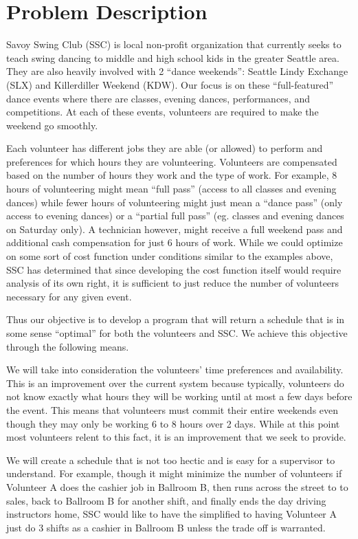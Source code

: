 \documentclass[12pt]{article}
\theoremstyle{definition}
\begin{document}
\section{Problem Description}
\begin{multicols}{2}
Savoy Swing Club (SSC) is local non-profit organization that currently seeks to teach swing dancing to middle and high school kids in the greater Seattle area.
They are also heavily involved with 2 ``dance weekends'': Seattle Lindy Exchange (SLX) and Killerdiller Weekend (KDW). Our focus is on these ``full-featured'' dance events where there are classes, evening dances, performances, and competitions.
At each of these events, volunteers are required to make the weekend go smoothly.

Each volunteer has different jobs they are able (or allowed) to perform and preferences for which hours they are volunteering.
Volunteers are compensated based on the number of hours they work and the type of work.
For example, 8 hours of volunteering might mean “full pass” (access to all classes and evening dances) while fewer hours of volunteering might just mean a “dance pass” (only access to evening dances) or a “partial full pass” (eg. classes and evening dances on Saturday only).
A technician however, might receive a full weekend pass and additional cash compensation for just 6 hours of work.
While we could optimize on some sort of cost function under conditions similar to the examples above, SSC has determined that since developing the cost function itself would require analysis of its own right, it is sufficient to just reduce the number of volunteers necessary for any given event.

Thus our objective is to develop a program that will return a schedule that is in some sense ``optimal'' for both the volunteers and SSC.
We achieve this objective through the following means.

We will take into consideration the volunteers' time preferences and availability.
This is an improvement over the current system because typically, volunteers do not know exactly what hours they will be working until at most a few days before the event.
This means that volunteers must commit their entire weekends even though they may only be working 6 to 8 hours over 2 days.
While at this point most volunteers relent to this fact, it is an improvement that we seek to provide.

We will create a schedule that is not too hectic and is easy for a supervisor to understand.
For example, though it might minimize the number of volunteers if Volunteer A does the cashier job in Ballroom B, then runs across the street to to sales, back to Ballroom B for another shift, and finally ends the day driving instructors home, SSC would like to have the simplified to having Volunteer A just do 3 shifts as a cashier in Ballroom B unless the trade off is warranted.


\end{multicols}
\end{document}
